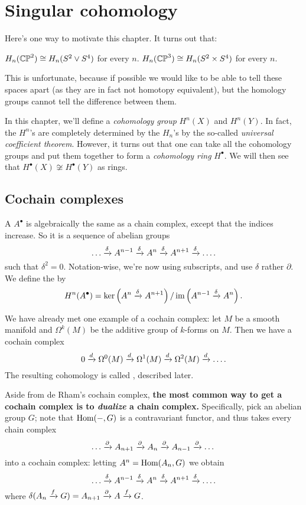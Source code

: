 \chapter{Singular cohomology}
Here's one way to motivate this chapter. It turns out that:
\begin{itemize}
	\ii $H_n(\mathbb{CP}^2) \cong H_n(S^2 \vee S^4)$ for every $n$.
	\ii $H_n(\mathbb{CP}^3) \cong H_n(S^2 \times S^4)$ for every $n$.
\end{itemize}
This is unfortunate, because if possible we would like
to be able to tell these spaces apart (as they are
in fact not homotopy equivalent), but the homology groups
cannot tell the difference between them.

In this chapter, we'll define a \emph{cohomology group} $H^n(X)$ and $H^n(Y)$.
In fact, the $H^n$'s are completely determined by the $H_n$'s
by the so-called \emph{universal coefficient theorem}.
However, it turns out that one can take all the cohomology groups and put
them together to form a \emph{cohomology ring} $H^\bullet$.
We will then see that $H^\bullet(X) \not\cong H^\bullet(Y)$ as rings.

\section{Cochain complexes}
\begin{definition}
A  $A^\bullet$ is algebraically the same as a chain complex, except that the indices increase.
So it is a sequence of abelian groups
\[ \dots \xrightarrow{\delta} A^{n-1} \xrightarrow{\delta} A^n \xrightarrow{\delta} A^{n+1} \xrightarrow{\delta} \dots. \]
such that $\delta^2 = 0$.
Notation-wise, we're now using subscripts, and use $\delta$ rather $\partial$.
We define the  by
\[ H^n(A^\bullet) = \ker\left( A^n \xrightarrow{\delta} A^{n+1} \right)
	/ \operatorname{im}\left( A^{n-1} \xrightarrow{\delta} A^n \right). \]
\end{definition}

\begin{example}
	We have already met one example of a cochain complex:
	let $M$ be a smooth manifold and $\Omega^k(M)$ be the
	additive group of $k$-forms on $M$.
	Then we have a cochain complex
	\[ 0 \xrightarrow{d} \Omega^0(M)
		\xrightarrow{d} \Omega^1(M) \xrightarrow{d} \Omega^2(M)
		\xrightarrow{d} \dots. \]
	The resulting cohomology is called ,
	described later.
\end{example}

Aside from de Rham's cochain complex,
\textbf{the most common way to get a cochain complex
is to \emph{dualize} a chain complex.}
Specifically, pick an abelian group $G$;
note that $\operatorname{Hom}(-, G)$ is a contravariant functor,
and thus takes every chain complex
\[ \dots \xrightarrow{\partial} A_{n+1} \xrightarrow{\partial}
	A_n \xrightarrow{\partial} A_{n-1} \xrightarrow{\partial} \dots \]
into a cochain complex: letting $A^n = \operatorname{Hom}(A_n, G)$ we obtain
\[ \dots \xrightarrow{\delta} A^{n-1} \xrightarrow{\delta}
	A^n \xrightarrow{\delta} A^{n+1} \xrightarrow{\delta} \dots. \]
where $\delta(A_n \xrightarrow{f} G) = A_{n+1} \xrightarrow{\partial} A \xrightarrow{f} G$.

